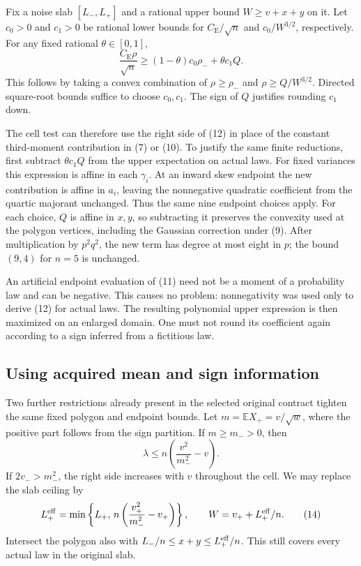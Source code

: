 \documentclass[11pt,a4paper]{article}
\newcommand{\E}{\mathbb E}
\newcommand{\CE}{C_{\mathrm E}}
\begin{document}
Fix a noise slab $[L_-,L_+]$ and a rational upper bound
$W\ge v+x+y$ on it. Let $c_0>0$ and $c_1>0$ be rational lower
bounds for $\CE/\sqrt n$ and $c_0/W^{3/2}$, respectively.
For any fixed rational $\theta\in[0,1]$,
\[
 \frac{\CE\rho}{\sqrt n}
 \ge (1-\theta)c_0\rho_-+\theta c_1Q.
 \tag{12}
\]
This follows by taking a convex combination of $\rho\ge\rho_-$
and $\rho\ge Q/W^{3/2}$. Directed square-root bounds suffice to
choose $c_0,c_1$. The sign of $Q$ justifies rounding $c_1$ down.

The cell test can therefore use the right side of (12) in place of
the constant third-moment contribution in (7) or (10). To justify
the same finite reductions, first subtract $\theta c_1Q$ from
the upper expectation on actual laws. For fixed variances this
expression is affine in each $\gamma_i$. At an inward skew
endpoint the new contribution is affine in $a_i$, leaving the
nonnegative quadratic coefficient from the quartic majorant
unchanged. Thus the same nine endpoint choices apply. For each
choice, $Q$ is affine in $x,y$, so subtracting it preserves the
convexity used at the polygon vertices, including the Gaussian
correction under (9). After multiplication by $p^2q^2$, the new
term has degree at most eight in $p$; the bound $(9,4)$ for $n=5$
is unchanged.

An artificial endpoint evaluation of (11) need not be a moment
of a probability law and can be negative. This causes no problem:
nonnegativity was used only to derive (12) for actual laws.
The resulting polynomial upper expression is then maximized on
an enlarged domain. One must not round its coefficient again
according to a sign inferred from a fictitious law.

\subsection{Using acquired mean and sign information}
Two further restrictions already present in the selected original
contract tighten the same fixed polygon and endpoint bounds.
Let $m=\E X_+=v/\sqrt w$, where the positive part follows from
the sign partition. If $m\ge m_->0$, then
\[
 \lambda\le n\left(\frac{v^2}{m_-^2}-v\right).
 \tag{13}
\]
If $2v_->m_-^2$, the right side increases with $v$ throughout
the cell. We may replace the slab ceiling by
\[
 L_+^{\rm eff}=\min\left\{L_+,\,
          n\left(\frac{v_+^2}{m_-^2}-v_+\right)\right\},
 \qquad W=v_++L_+^{\rm eff}/n.
 \tag{14}
\]
Intersect the polygon also with
$L_-/n\le x+y\le L_+^{\rm eff}/n$.
This still covers every actual law in the original slab.
\end{document}
